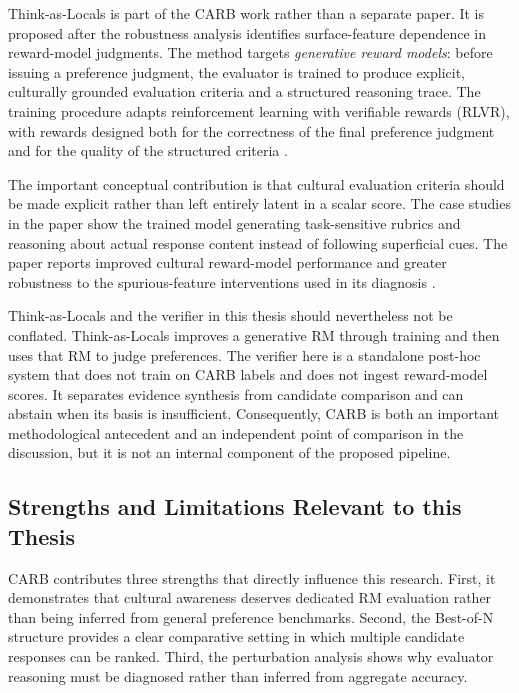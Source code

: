 Think-as-Locals is part of the CARB work rather than a separate paper. It is proposed after the robustness analysis identifies surface-feature dependence in reward-model judgments. The method targets \emph{generative reward models}: before issuing a preference judgment, the evaluator is trained to produce explicit, culturally grounded evaluation criteria and a structured reasoning trace. The training procedure adapts reinforcement learning with verifiable rewards (RLVR), with rewards designed both for the correctness of the final preference judgment and for the quality of the structured criteria \parencite{zhang2026carb}.

The important conceptual contribution is that cultural evaluation criteria should be made explicit rather than left entirely latent in a scalar score. The case studies in the paper show the trained model generating task-sensitive rubrics and reasoning about actual response content instead of following superficial cues. The paper reports improved cultural reward-model performance and greater robustness to the spurious-feature interventions used in its diagnosis \parencite{zhang2026carb}.

Think-as-Locals and the verifier in this thesis should nevertheless not be conflated. Think-as-Locals improves a generative RM through training and then uses that RM to judge preferences. The verifier here is a standalone post-hoc system that does not train on CARB labels and does not ingest reward-model scores. It separates evidence synthesis from candidate comparison and can abstain when its basis is insufficient. Consequently, CARB is both an important methodological antecedent and an independent point of comparison in the discussion, but it is not an internal component of the proposed pipeline.

\subsection{Strengths and Limitations Relevant to this Thesis}

CARB contributes three strengths that directly influence this research. First, it demonstrates that cultural awareness deserves dedicated RM evaluation rather than being inferred from general preference benchmarks. Second, the Best-of-N structure provides a clear comparative setting in which multiple candidate responses can be ranked. Third, the perturbation analysis shows why evaluator reasoning must be diagnosed rather than inferred from aggregate accuracy.


